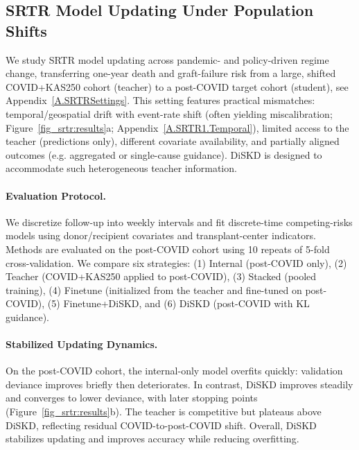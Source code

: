 \documentclass{article}
\theoremstyle{plain}
\theoremstyle{definition}
\theoremstyle{remark}
\begin{document}
\subsection{SRTR Model Updating Under Population Shifts}
\label{SRTR1}
We study SRTR model updating across pandemic- and policy-driven regime change, transferring one-year death and graft-failure risk from a large, shifted COVID+KAS250 cohort (teacher) to a post-COVID target cohort (student), see Appendix~\ref{A.SRTRSettings}. This setting features practical mismatches: temporal/geospatial drift with event-rate shift (often yielding miscalibration; Figure~\ref{fig_srtr:results}a; Appendix~\ref{A.SRTR1.Temporal}), limited access to the teacher (predictions only), different covariate availability, and partially aligned outcomes (e.g. aggregated or single-cause guidance). DiSKD is designed to accommodate such heterogeneous teacher information.









\paragraph{Evaluation Protocol.}
We discretize follow-up into weekly intervals and fit discrete-time competing-risks models using donor/recipient covariates and transplant-center indicators. Methods are evaluated on the post-COVID cohort using 10 repeats of 5-fold cross-validation. We compare six strategies: (1) Internal (post-COVID only), (2) Teacher (COVID+KAS250 applied to post-COVID), (3) Stacked (pooled training), (4) Finetune (initialized from the teacher and fine-tuned on post-COVID), (5) Finetune+DiSKD, and (6) DiSKD (post-COVID with KL guidance).





\paragraph{Stabilized Updating Dynamics.}
On the post-COVID cohort, the internal-only model overfits quickly: validation deviance improves briefly then deteriorates. In contrast, DiSKD improves steadily and converges to lower deviance, with later stopping points (Figure~\ref{fig_srtr:results}b). The teacher is competitive but plateaus above DiSKD, reflecting residual COVID-to-post-COVID shift. Overall, DiSKD stabilizes updating and improves accuracy while reducing overfitting.
\end{document}
